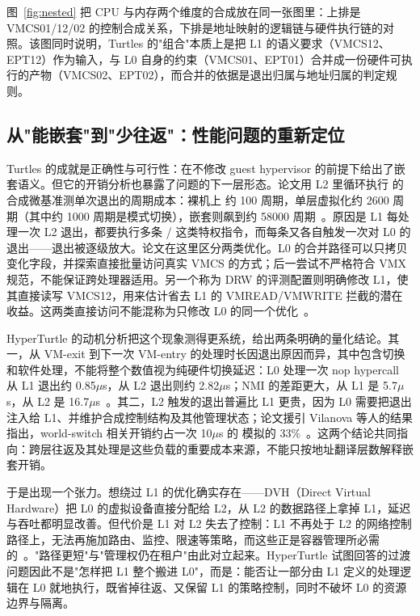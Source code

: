 

图~\ref{fig:nested} 把 CPU 与内存两个维度的合成放在同一张图里：上排是 VMCS01/12/02 的控制合成关系，下排是地址映射的逻辑链与硬件执行链的对照。该图同时说明，Turtles 的"组合"本质上是把 L1 的语义要求（VMCS12、EPT12）作为输入，与 L0 自身的约束（VMCS01、EPT01）合并成一份硬件可执行的产物（VMCS02、EPT02），而合并的依据是退出归属与地址归属的判定规则。

\subsection{从"能嵌套"到"少往返"：性能问题的重新定位}\label{sec:nested-cost}

Turtles 的成就是正确性与可行性：在不修改 guest hypervisor 的前提下给出了嵌套语义。但它的开销分析也暴露了问题的下一层形态。论文用 L2 里循环执行  的合成微基准测单次退出的周期成本：裸机上  约 100 周期，单层虚拟化约 2600 周期（其中约 1000 周期是模式切换），嵌套则飙到约 58000 周期~\cite{source7}。原因是 L1 每处理一次 L2 退出，都要执行多条 / 这类特权指令，而每条又各自触发一次对 L0 的退出——退出被逐级放大。论文在这里区分两类优化。L0 的合并路径可以只拷贝变化字段，并探索直接批量访问真实 VMCS 的方式；后一尝试不严格符合 VMX 规范，不能保证跨处理器适用。另一个称为 DRW 的评测配置则明确修改 L1，使其直接读写 VMCS12，用来估计省去 L1 的 VMREAD/VMWRITE 拦截的潜在收益。这两类直接访问不能混称为只修改 L0 的同一个优化~\cite{source7}。

HyperTurtle 的动机分析把这个现象测得更系统，给出两条明确的量化结论。其一，从 VM-exit 到下一次 VM-entry 的处理时长因退出原因而异，其中包含切换和软件处理，不能将整个数值视为纯硬件切换延迟：L0 处理一次 nop hypercall 从 L1 退出约 0.85$\mu$s，从 L2 退出则约 2.82$\mu$s；NMI 的差距更大，从 L1 是 5.7$\mu$s，从 L2 是 16.7$\mu$s~\cite{source8}。其二，L2 触发的退出普遍比 L1 更贵，因为 L0 需要把退出注入给 L1、并维护合成控制结构及其他管理状态；论文援引 Vilanova 等人的结果指出，world-switch 相关开销约占一次 10$\mu$s 的  模拟的 33\%~\cite{source8}。这两个结论共同指向：跨层往返及其处理是这些负载的重要成本来源，不能只按地址翻译层数解释嵌套开销。

于是出现一个张力。想绕过 L1 的优化确实存在——DVH（Direct Virtual Hardware）把 L0 的虚拟设备直接分配给 L2，从 L2 的数据路径上拿掉 L1，延迟与吞吐都明显改善。但代价是 L1 对 L2 失去了控制：L1 不再处于 L2 的网络控制路径上，无法再施加路由、监控、限速等策略，而这些正是容器管理所必需的~\cite{source8}。"路径更短"与"管理权仍在租户"由此对立起来。HyperTurtle 试图回答的过渡问题因此不是"怎样把 L1 整个搬进 L0"，而是：能否让一部分由 L1 定义的处理逻辑在 L0 就地执行，既省掉往返、又保留 L1 的策略控制，同时不破坏 L0 的资源边界与隔离。

